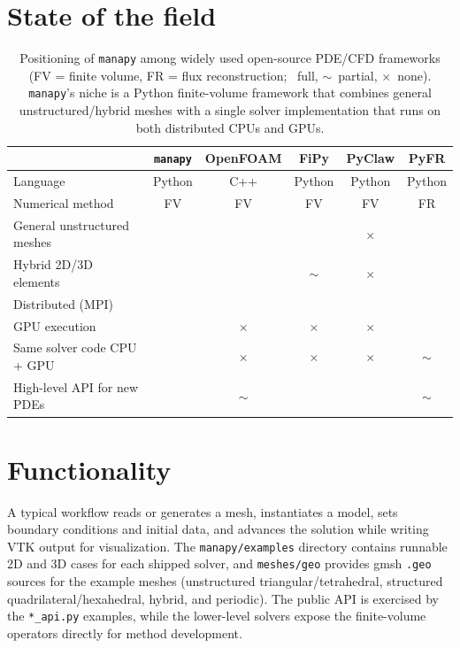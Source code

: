 \documentclass[11pt]{article}
\newcommand{\yes}{\checkmark}
\newcommand{\no}{$\times$}
\newcommand{\partiel}{$\sim$}
\begin{document}
\section{State of the field}

\begin{table}[htbp]
\centering
\small
\begin{tabular}{lccccc}
\toprule
 & \texttt{manapy} & OpenFOAM & FiPy & PyClaw & PyFR \\
\midrule
Language                    & Python & C++ & Python & Python & Python \\
Numerical method            & FV & FV & FV & FV & FR \\
General unstructured meshes & \yes & \yes & \yes & \no & \yes \\
Hybrid 2D/3D elements       & \yes & \yes & \partiel & \no & \yes \\
Distributed (MPI)           & \yes & \yes & \yes & \yes & \yes \\
GPU execution               & \yes & \no & \no & \no & \yes \\
Same solver code CPU + GPU  & \yes & \no & \no & \no & \partiel \\
High-level API for new PDEs & \yes & \partiel & \yes & \yes & \partiel \\
\bottomrule
\end{tabular}
\caption{Positioning of \texttt{manapy} among widely used open-source PDE/CFD
frameworks (FV = finite volume, FR = flux reconstruction;
\yes\ full, \partiel\ partial, \no\ none). \texttt{manapy}'s niche is a Python
finite-volume framework that combines general unstructured/hybrid meshes with a
single solver implementation that runs on both distributed CPUs and GPUs.}
\label{tab:sotf}
\end{table}

\section{Functionality}

A typical workflow reads or generates a mesh, instantiates a model, sets boundary
conditions and initial data, and advances the solution while writing VTK output
for visualization. The \texttt{manapy/examples} directory contains runnable 2D
and 3D cases for each shipped solver, and \texttt{meshes/geo} provides gmsh
\texttt{.geo} sources for the example meshes (unstructured triangular/tetrahedral,
structured quadrilateral/hexahedral, hybrid, and periodic). The public API is
exercised by the \texttt{*\_api.py} examples, while the lower-level solvers expose
the finite-volume operators directly for method development.
\end{document}
